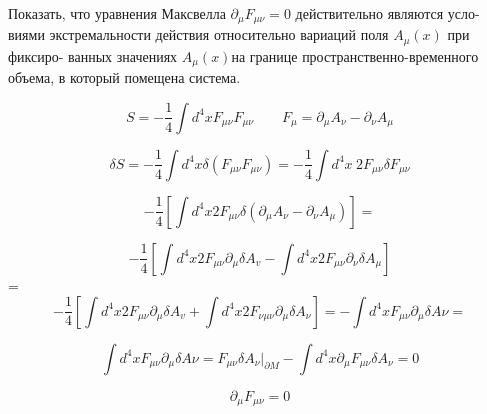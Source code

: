 \begin{problem}[Рубаков I]
	Показать, что уравнения Максвелла $\partial_{\mu} F_{\mu \nu}=0$ действительно являются усло- 
	виями экстремальности действия относительно вариаций поля $A_{\mu}(x)$ при фиксиро- 
		ванных значениях $A_{\mu}(x)$на границе пространственно-временного объема, в который 
		помещена система. 
		
\end{problem}

\begin{solution}
	$$S=-\frac{1}{4} \int d^{4} x F_{\mu \nu} F_{\mu\nu} \qquad F_{\mu}=\partial_{\mu} A_{\nu}-\partial_{\nu} A_{\mu}$$
	
	$$\delta S =-\frac{1}{4} \int d^{4} x \delta\left(F_{\mu \nu} F_{\mu \nu}\right) =-\frac{1}{4} \int d^{4} x  \hspace{3pt }2 F_{\mu \nu} \delta F_{\mu\nu}$$
	
	
	$$-\frac{1}{4} \left[\int d^{4} x 2 F_{\mu \nu} \delta\left(\partial_{\mu} A_{\nu}-\partial_{\nu} A_{\mu}\right) \right] = 
	$$
	
	$$
	-\frac{1}{4} \left[ \int d^{4} x 2 F_{\mu \nu}  \partial_{\mu} \delta A_{v}-\int d^{4} x 2 F_{\mu \nu}  \partial_{\nu} \delta A_{\mu}  \right]
	$$ = 
	$$
	-\frac{1}{4} \left[ \int d^{4} x 2 F_{\mu \nu}  \partial_{\mu} \delta A_{v} + \int d^{4} x 2 F_{\nu \mu \nu}  \partial_{\mu} \delta A_{\nu} \right] = 
	- \int d^{4} x  F_{\mu \nu} \partial_{\mu} \delta A \nu = 
	$$
	
	$$
	\int d^{4} x  F_{\mu \nu} \partial_{\mu} \delta A \nu = F_{\mu \nu} \delta A_{\nu} |_{\partial M } - 	\int d^{4} x \partial_{\mu} F_{\mu \nu}  \delta A_{\nu} = 0
	$$
	
	$$
	\partial_{\mu} F_{\mu \nu} = 0
	$$
	
\end{solution}